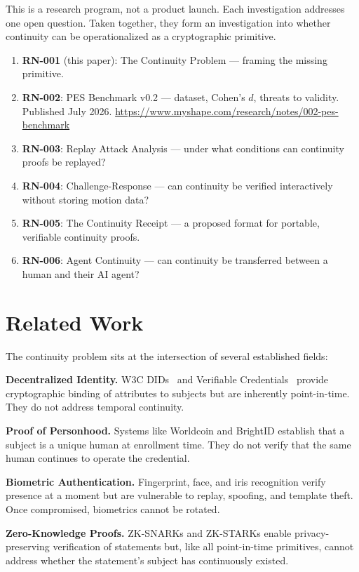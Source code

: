\documentclass[conference]{IEEEtran}
\begin{document}
This is a research program, not a product launch. Each investigation addresses one open question. Taken together, they form an investigation into whether continuity can be operationalized as a cryptographic primitive.

\begin{enumerate}
\item \textbf{RN-001} (this paper): The Continuity Problem — framing the missing primitive.
\item \textbf{RN-002}: PES Benchmark v0.2 — dataset, Cohen's $d$, threats to validity. Published July 2026. \url{https://www.myshape.com/research/notes/002-pes-benchmark}
\item \textbf{RN-003}: Replay Attack Analysis — under what conditions can continuity proofs be replayed?
\item \textbf{RN-004}: Challenge-Response — can continuity be verified interactively without storing motion data?
\item \textbf{RN-005}: The Continuity Receipt — a proposed format for portable, verifiable continuity proofs.
\item \textbf{RN-006}: Agent Continuity — can continuity be transferred between a human and their AI agent?
\end{enumerate}

\section{Related Work}

The continuity problem sits at the intersection of several established fields:

\textbf{Decentralized Identity.} W3C DIDs~\cite{w3c-did} and Verifiable Credentials~\cite{w3c-vc} provide cryptographic binding of attributes to subjects but are inherently point-in-time. They do not address temporal continuity.

\textbf{Proof of Personhood.} Systems like Worldcoin and BrightID establish that a subject is a unique human at enrollment time. They do not verify that the same human continues to operate the credential.

\textbf{Biometric Authentication.} Fingerprint, face, and iris recognition verify presence at a moment but are vulnerable to replay, spoofing, and template theft. Once compromised, biometrics cannot be rotated.

\textbf{Zero-Knowledge Proofs.} ZK-SNARKs and ZK-STARKs enable privacy-preserving verification of statements but, like all point-in-time primitives, cannot address whether the statement's subject has continuously existed.
\end{document}
